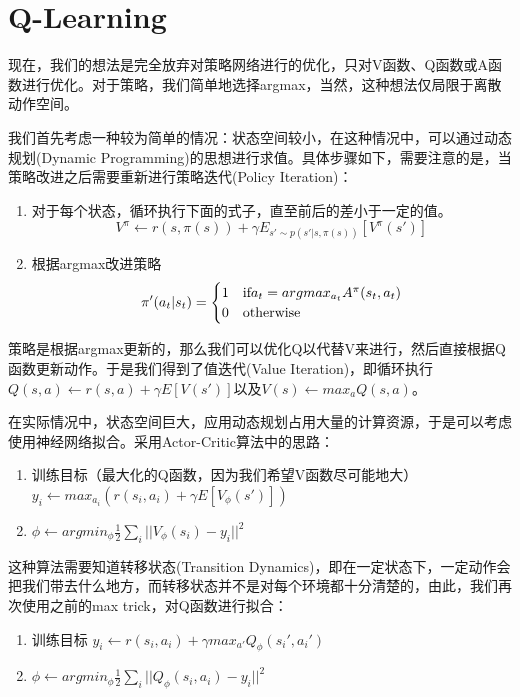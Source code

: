 \documentclass{article}
\theoremstyle{definition}
\begin{document}
\section{Q-Learning}
\par 现在，我们的想法是完全放弃对策略网络进行的优化，只对V函数、Q函数或A函数进行优化。对于策略，我们简单地选择argmax，当然，这种想法仅局限于离散动作空间。
\par 我们首先考虑一种较为简单的情况：状态空间较小，在这种情况中，可以通过动态规划(Dynamic Programming)的思想进行求值。具体步骤如下，需要注意的是，当策略改进之后需要重新进行策略迭代(Policy Iteration)：
\begin{enumerate}
    \item 对于每个状态，循环执行下面的式子，直至前后的差小于一定的值。
    \[
    V^{\pi}\leftarrow r(s,\pi(s))+\gamma E_{s'\sim p(s'|s,\pi(s))}[V^{\pi}(s')]
    \]
    \item 根据argmax改进策略
    \[
    \pi'(a_t|s_t)=\begin{cases}
    1 & \text{if}  \space a_t=argmax_{a_t}A^{\pi}(s_t,a_t) \\
    0 & \text{otherwise} \\
    \end{cases}
    \]
\end{enumerate}
\par 策略是根据argmax更新的，那么我们可以优化Q以代替V来进行，然后直接根据Q函数更新动作。于是我们得到了值迭代(Value Iteration)，即循环执行$ Q(s,a)\leftarrow r(s,a)+\gamma E[V(s')] $以及$ V(s)\leftarrow max_a Q(s,a) $。
\par 在实际情况中，状态空间巨大，应用动态规划占用大量的计算资源，于是可以考虑使用神经网络拟合。采用Actor-Critic算法中的思路：
\begin{enumerate}
    \item 训练目标（最大化的Q函数，因为我们希望V函数尽可能地大） $ y_i\leftarrow max_{a_i} (r(s_i,a_i)+\gamma E[V_{\phi}(s')]) $
    \item $ \phi \leftarrow argmin_{\phi}\frac{1}{2}\sum_i ||V_{\phi}(s_i)-y_i||^2 $
\end{enumerate}
\par 这种算法需要知道转移状态(Transition Dynamics)，即在一定状态下，一定动作会把我们带去什么地方，而转移状态并不是对每个环境都十分清楚的，由此，我们再次使用之前的max trick，对Q函数进行拟合：
\begin{enumerate}
    \item 训练目标 $ y_i\leftarrow r(s_i,a_i)+\gamma max_{a'}Q_{\phi}(s_i',a_i') $
    \item $ \phi \leftarrow argmin_{\phi}\frac{1}{2}\sum_i ||Q_{\phi}(s_i,a_i)-y_i||^2 $
\end{enumerate}
\end{document}
